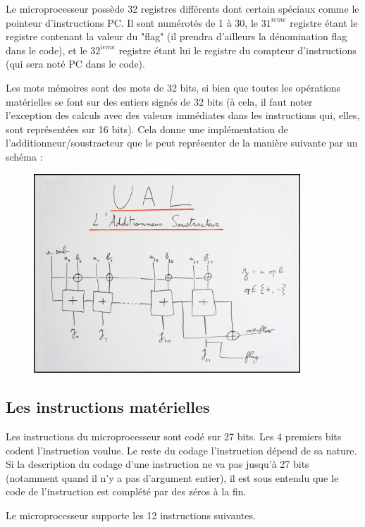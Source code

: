 \documentclass[a4paper, 12pt, twoside]{report}
\begin{document}
Le microprocesseur possède 32 registres différents dont certain spéciaux comme le 
pointeur d'instructions PC. Il sont numérotés de 1 à 30, le $31^{ieme}$ registre étant le 
registre contenant la valeur du "flag" (il prendra d'ailleurs la dénomination flag dans
le code), et le $32^{ieme}$ registre étant lui le registre du compteur d'instructions
(qui sera noté PC dans le code).

Les mots mémoires sont des mots de 32 bits, si bien que toutes les opérations matérielles
se font sur des entiers signés de 32 bits (à cela, il faut noter l'exception des calculs 
avec des valeurs immédiates dans les instructions qui, elles, sont représentées sur 
16 bits). Cela donne une implémentation de l'additionneur/soustracteur que le peut
représenter de la manière suivante par un schéma :\\

\begin{figure}[!h]
\centering
\includegraphics[width=10cm]{additionneur.jpg}
\end{figure}

\subsection{Les instructions matérielles}

Les instructions du microprocesseur sont codé sur 27 bits. Les 4 premiers bits 
codent l'instruction voulue. Le reste du codage l'instruction dépend de sa nature.
Si la description du codage d'une instruction ne va pas jusqu'à 27 bits (notamment
quand il n'y a pas d'argument entier), il est sous entendu que le code de 
l'instruction est complété par des zéros à la fin.

Le microprocesseur supporte les 12 instructions suivantes.
\end{document}

